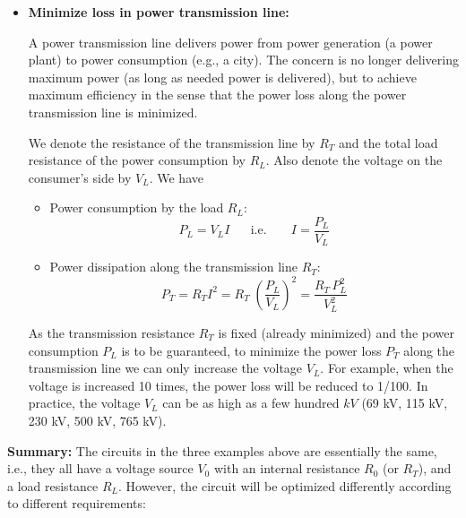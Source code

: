 \documentclass{article}
\begin{document}
\begin{itemize}
\begin{comment}
  Also, the {\em characteristic resistance} of most transmission 
  lines (e.g., coaxial cables to conduct high frequency signals) is 
  $50\Omega$, all signal generators need to be designed to have a 
  $50\Omega$ output resistance to avoid reflection. 
  \end{comment}

\item {\bf Minimize loss in power transmission line:} 


  A power transmission line delivers power from power generation (a 
  power plant) to power consumption (e.g., a city). The concern is no
  longer delivering maximum power (as long as needed power is delivered),
  but to achieve maximum efficiency in the sense that the power loss 
  along the power transmission line is minimized.

  We denote the resistance of the transmission line by $R_T$ and the total 
  load resistance of the power consumption by $R_L$. Also denote the voltage
  on the consumer's side by $V_L$. We have
  \begin{itemize}
  \item Power consumption by the load $R_L$: 
    \begin{equation} 
      P_L=V_L I\;\;\;\;\;\; \mbox{i.e.}\;\;\;\;\;\;\; I=\frac{P_L}{V_L}
    \end{equation}
  \item Power dissipation along the transmission line $R_T$: 
    \begin{equation}
      P_T=R_T I^2=R_T \;\left(\frac{P_L}{V_L}\right)^2=\frac{R_T\,P_L^2}{V_L^2}
    \end{equation}
  \end{itemize}
  As the transmission resistance $R_T$ is fixed (already minimized) and 
  the power consumption $P_L$ is to be guaranteed, to minimize the power
  loss $P_T$ along the transmission line we can only increase the voltage
  $V_L$. For example, when the voltage is increased 10 times, the power 
  loss will be reduced to 1/100. In practice, the voltage $V_L$ can be 
  as high as a few hundred $kV$ (69 kV, 115 kV, 230 kV, 500 kV, 765 kV).

\end{itemize}

{\bf Summary: } The circuits in the three examples above are essentially
the same, i.e., they all have a voltage source $V_0$ with an internal 
resistance $R_0$ (or $R_T$), and a load resistance $R_L$. However, the 
circuit will be optimized differently according to different requirements:
\end{document}
